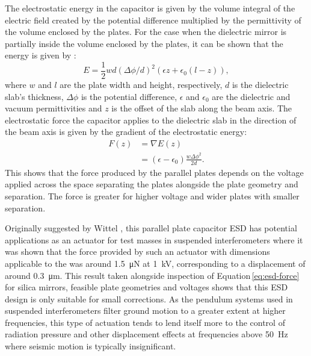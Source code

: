 The electrostatic energy in the capacitor is given by the volume integral of the electric field created by the potential difference multiplied by the permittivity of the volume enclosed by the plates. For the case when the dielectric mirror is partially inside the volume enclosed by the plates, it can be shown that the energy is given by \cite{Margulies1984}:
\begin{equation}
  E = \frac{1}{2} w d \left( \Delta \phi / d \right)^2 \left( \epsilon z + \epsilon_0 \left( l - z \right) \right),
\end{equation}
where $w$ and $l$ are the plate width and height, respectively, $d$ is the dielectric slab's thickness, $\Delta \phi$ is the potential difference, $\epsilon$ and $\epsilon_0$ are the dielectric and vacuum permittivities and $z$ is the offset of the slab along the beam axis. The electrostatic force the capacitor applies to the dielectric slab in the direction of the beam axis is given by the gradient of the electrostatic energy:
\begin{equation}
  \label{eq:esd-force}
  \begin{split}
    F \left( z \right) &= \nabla E \left( z \right) \\
                       &= \left( \epsilon - \epsilon_0 \right) \frac{w \Delta \phi^2}{2 d}.
  \end{split}
\end{equation}
This shows that the force produced by the parallel plates depends on the voltage applied across the space separating the plates alongside the plate geometry and separation. The force is greater for higher voltage and wider plates with smaller separation.

Originally suggested by Wittel \etal{} \cite{Wittel2015}, this parallel plate capacitor \gls{ESD} has potential applications as an actuator for test masses in suspended interferometers where it was shown that the force provided by such an actuator with dimensions applicable to the \AEIPROTOTYPE{} was around \SI{1.5}{\micro\newton} at \SI{1}{\kilo\volt}, corresponding to a displacement of around \SI{0.3}{\micro\meter}. This result taken alongside inspection of Equation\,\ref{eq:esd-force} for silica mirrors, feasible plate geometries and voltages shows that this \gls{ESD} design is only suitable for small corrections. As the pendulum systems used in suspended interferometers filter ground motion to a greater extent at higher frequencies, this type of actuation tends to lend itself more to the control of radiation pressure and other displacement effects at frequencies above \SI{50}{\hertz} where seismic motion is typically insignificant.

